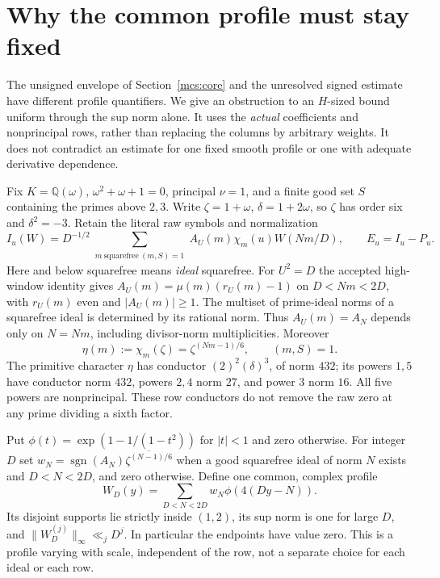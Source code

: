 \section{Why the common profile must stay fixed}\label{prf:core}
The unsigned envelope of Section~\ref{mcs:core} and the unresolved signed
estimate have different profile quantifiers. We give an obstruction to an
$H$-sized bound uniform through the sup norm alone. It uses the \emph{actual}
coefficients and nonprincipal rows, rather than replacing the columns by
arbitrary weights. It does not contradict an estimate for one fixed smooth
profile or one with adequate derivative dependence.

Fix $K=\mathbb Q(\omega)$, $\omega^2+\omega+1=0$, principal $\nu=1$, and a
finite good set $S$ containing the primes above $2,3$. Write
$\zeta=1+\omega$, $\delta=1+2\omega$, so $\zeta$ has order six and
$\delta^2=-3$. Retain the literal raw symbols and normalization
\[
 I_u(W)=D^{-1/2}\sum_{\substack{m\ \mathrm{squarefree}\ (m,S)=1}}
 A_U(m)\chi_m(u)W(Nm/D),\qquad E_u=I_u-P_u.
\]
Here and below squarefree means \emph{ideal} squarefree. For $U^2=D$ the
accepted high-window identity gives
$A_U(m)=\mu(m)(r_U(m)-1)$ on $D<Nm<2D$, with $r_U(m)$ even and
$|A_U(m)|\ge1$. The multiset of prime-ideal norms of a squarefree ideal
is determined by its rational norm. Thus $A_U(m)=A_N$ depends only on
$N=Nm$, including divisor-norm multiplicities. Moreover
\begin{equation}\label{prf:unit}
 \eta(m):=\chi_m(\zeta)=\zeta^{(Nm-1)/6},\qquad (m,S)=1.
\end{equation}
The primitive character $\eta$ has conductor $(2)^2(\delta)^3$, of norm
$432$; its powers $1,5$ have conductor norm $432$, powers $2,4$ norm $27$,
and power $3$ norm $16$. All five powers are nonprincipal. These row
conductors do not remove the raw zero at any prime dividing a sixth factor.

Put $\phi(t)=\exp(1-1/(1-t^2))$ for $|t|<1$ and zero otherwise.
For integer $D$ set $w_N=\operatorname{sgn}(A_N)\overline{\zeta^{(N-1)/6}}$
when a good squarefree ideal of norm $N$ exists and $D<N<2D$, and zero
otherwise. Define one common, complex profile
\begin{equation}\label{prf:profile}
 W_D(y)=\sum_{D<N<2D}w_N\phi(4(Dy-N)).
\end{equation}
Its disjoint supports lie strictly inside $(1,2)$, its sup norm is one for
large $D$, and $\|W_D^{(j)}\|_\infty\ll_jD^j$. In particular the endpoints
have value zero. This is a profile varying with scale, independent of the
row, not a separate choice for each ideal or each row.


